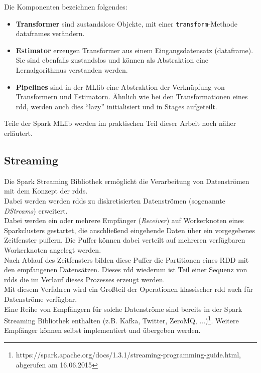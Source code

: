 Die Komponenten bezeichnen folgendes:
\begin{itemize}
	\item \textbf{Transformer} sind zustandslose Objekte, mit einer \lstinline|transform|-Methode \glspl{dataframe} verändern.
	\item \textbf{Estimator} erzeugen Transformer aus einem Eingangsdatensatz (\gls{dataframe}). Sie sind ebenfalls zustandslos und können als Abstraktion eine Lernalgorithmus verstanden werden.
	\item \textbf{Pipelines} sind in der MLlib eine Abstraktion der Verknüpfung von Transformern und Estimatorn. Ähnlich wie bei den Transformationen eines \gls{rdd}, werden auch dies "`lazy"' initialisiert und in Stages aufgeteilt.
\end{itemize}

Teile der Spark MLlib werden im praktischen Teil dieser Arbeit noch näher erläutert.\\

\subsection{Streaming}
Die Spark Streaming Bibliothek ermöglicht die Verarbeitung von Datenströmen mit dem Konzept der \glspl{rdd}.\\

Dabei werden werden \glspl{rdd} zu diskretisierten Datenströmen (sogenannte \textit{DStreams}) erweitert.\\

Dabei werden ein oder mehrere Empfänger (\textit{Receiver}) auf Workerknoten eines Sparkclusters gestartet, die anschließend eingehende Daten über ein vorgegebenes Zeitfenster puffern. Die Puffer können dabei verteilt auf mehreren verfügbaren Workerknoten angelegt werden.\\

Nach Ablauf des Zeitfensters bilden diese Puffer die Partitionen eines RDD mit den empfangenen Datensätzen. Dieses \gls{rdd} wiederum ist Teil einer Sequenz von \glspl{rdd} die im Verlauf dieses Prozesses erzeugt werden.\\

Mit diesem Verfahren wird ein Großteil der Operationen klassischer \gls{rdd} auch für Datenströme verfügbar.\\

Eine Reihe von Empfängern für solche Datenströme sind bereits in der Spark Streaming Bibliothek enthalten (z.B. Kafka, Twitter, ZeroMQ, ...)\footnote{https://spark.apache.org/docs/1.3.1/streaming-programming-guide.html, abgerufen am 16.06.2015}. Weitere Empfänger können selbst implementiert und übergeben werden.

